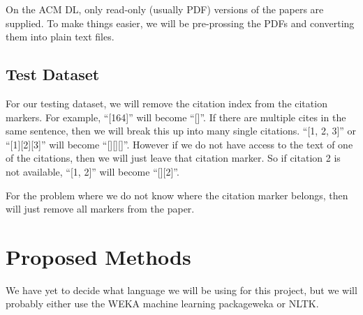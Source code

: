 \documentclass[]{IEEEtran}
\begin{document}
On the ACM DL, only read-only (usually PDF) versions of the papers are supplied.
To make things easier, we will be pre-prossing the PDFs and converting them into plain text files.

\subsection{Test Dataset}
For our testing dataset, we will remove the citation index from the citation markers. For example,
``[164]'' will become ``[]''. If there are multiple cites in the same sentence, then we will break this up into
many single citations. ``[1, 2, 3]'' or ``[1][2][3]'' will become ``[][][]''. However if we do not have access to the
text of one of the citations, then we will just leave that citation marker. So if citation 2 is not available,
``[1, 2]'' will become ``[][2]''.

For the problem where we do not know where the citation marker belongs, then will just remove all markers from the paper.

\section{Proposed Methods}
We have yet to decide what language we will be using for this project, but we will probably either use the WEKA machine learning
packageweka\cite{weka} or NLTK\cite{nltk}.



\end{document}
